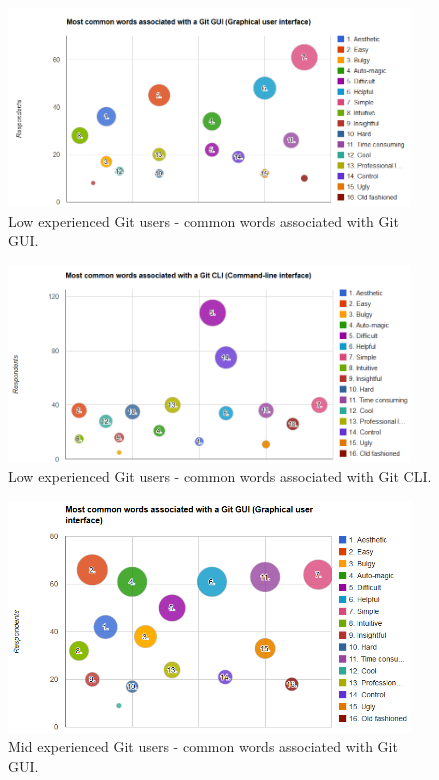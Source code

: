 \documentclass[a4paper,oneside]{bth} %
\begin{document}
		\begin{figure}[H]
			\centering
			\includegraphics[width=0.95\textwidth]{graphs/common-words-low-users-gui.png}
			\caption{Low experienced Git users - common words associated with Git GUI.}
			\label{fig:Low users - common words associated with Git GUI.}
		\end{figure}
		\begin{figure}[H]
			\centering
			\includegraphics[width=0.95\textwidth]{graphs/common-words-low-users-cli.png}
			\caption{Low experienced Git users - common words associated with Git CLI.}
			\label{fig:Low users - common words associated with Git CLI.}
		\end{figure}
		\begin{figure}[H]
			\centering
			\includegraphics[width=0.95\textwidth]{graphs/common-words-mid-users-gui.png}
			\caption{Mid experienced Git users - common words associated with Git GUI.}
			\label{fig:Mid users - common words associated with Git GUI.}
		\end{figure}
\end{document}
